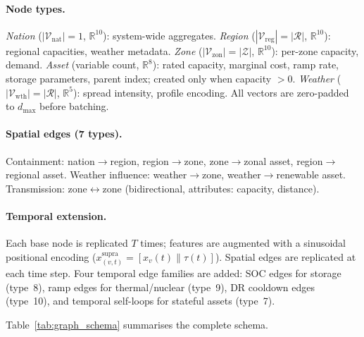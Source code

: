 \documentclass{article}
\begin{document}
\paragraph{Node types.}
\emph{Nation} ($|\mathcal{V}_{\mathrm{nat}}|{=}1$, $\mathbb{R}^{10}$): system-wide aggregates.
\emph{Region} ($|\mathcal{V}_{\mathrm{reg}}|{=}|\mathcal{R}|$, $\mathbb{R}^{10}$): regional capacities, weather metadata.
\emph{Zone} ($|\mathcal{V}_{\mathrm{zon}}|{=}|\mathcal{Z}|$, $\mathbb{R}^{10}$): per-zone capacity, demand.
\emph{Asset} (variable count, $\mathbb{R}^{8}$): rated capacity, marginal cost, ramp rate, storage parameters, parent index; created only when capacity $>0$.
\emph{Weather} ($|\mathcal{V}_{\mathrm{wth}}|{=}|\mathcal{R}|$, $\mathbb{R}^{5}$): spread intensity, profile encoding.
All vectors are zero-padded to $d_{\max}$ before batching.

\paragraph{Spatial edges (7 types).}
Containment: nation$\to$region, region$\to$zone, zone$\to$zonal asset, region$\to$regional asset.
Weather influence: weather$\to$zone, weather$\to$renewable asset.
Transmission: zone$\leftrightarrow$zone (bidirectional, attributes: capacity, distance).

\paragraph{Temporal extension.}
Each base node is replicated $T$ times; features are augmented with a sinusoidal positional encoding ($x^{\mathrm{supra}}_{(v,t)} = [x_v(t) \| \tau(t)]$).
Spatial edges are replicated at each time step. Four temporal edge families are added: SOC edges for storage (type~8), ramp edges for thermal/nuclear (type~9), DR cooldown edges (type~10), and temporal self-loops for stateful assets (type~7).

Table~\ref{tab:graph_schema} summarises the complete schema.
\end{document}
